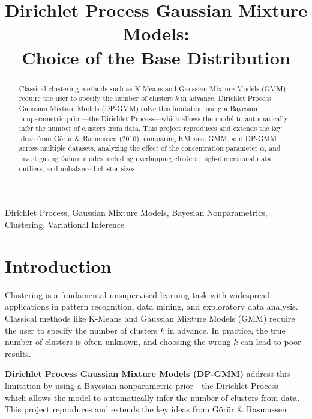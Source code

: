 \documentclass[conference]{IEEEtran}
\begin{document}
\title{Dirichlet Process Gaussian Mixture Models:\\Choice of the Base Distribution}

\author{
}

\maketitle

\begin{abstract}
Classical clustering methods such as K-Means and Gaussian Mixture Models (GMM) require the user to specify the number of clusters \textit{k} in advance. Dirichlet Process Gaussian Mixture Models (DP-GMM) solve this limitation using a Bayesian nonparametric prior---the Dirichlet Process---which allows the model to automatically infer the number of clusters from data. This project reproduces and extends the key ideas from G\"{o}r\"{u}r \& Rasmussen (2010), comparing KMeans, GMM, and DP-GMM across multiple datasets, analyzing the effect of the concentration parameter $\alpha$, and investigating failure modes including overlapping clusters, high-dimensional data, outliers, and unbalanced cluster sizes.
\end{abstract}

\begin{IEEEkeywords}
Dirichlet Process, Gaussian Mixture Models, Bayesian Nonparametrics, Clustering, Variational Inference
\end{IEEEkeywords}

\section{Introduction}

Clustering is a fundamental unsupervised learning task with widespread applications in pattern recognition, data mining, and exploratory data analysis. Classical methods like K-Means and Gaussian Mixture Models (GMM) require the user to specify the number of clusters $k$ in advance. In practice, the true number of clusters is often unknown, and choosing the wrong $k$ can lead to poor results.

\textbf{Dirichlet Process Gaussian Mixture Models (DP-GMM)} address this limitation by using a Bayesian nonparametric prior---the Dirichlet Process---which allows the model to automatically infer the number of clusters from data. This project reproduces and extends the key ideas from G\"{o}r\"{u}r \& Rasmussen~\cite{goeruer2010}.
\end{document}

